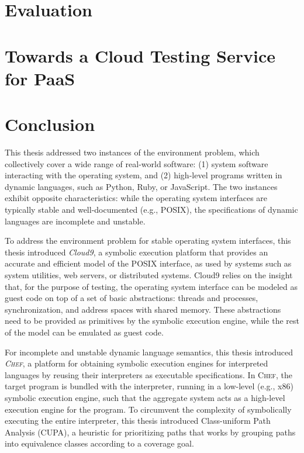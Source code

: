 \documentclass[letterpaper,10pt,oneside]{book}
\newcommand{\cnine}{Cloud9\xspace}
\newcommand{\chef}{\textsc{Chef}\xspace}
\begin{document}
\chapter{Evaluation}
\label{ch:evaluation}


\chapter{Towards a Cloud Testing Service for PaaS}
\label{ch:paas}


\chapter{Conclusion}
\label{ch:conclusion}

This thesis addressed two instances of the environment problem, which collectively cover a wide range of real-world software: (1) system software interacting with the operating system, and (2) high-level programs written in dynamic languages, such as Python, Ruby, or JavaScript.  The two instances exhibit opposite characteristics: while the operating system interfaces are typically stable and well-documented (e.g., POSIX), the specifications of dynamic languages are incomplete and unstable.

To address the environment problem for stable operating system interfaces, this thesis introduced \emph{\cnine}, a symbolic execution platform that provides an accurate and efficient model of the POSIX interface, as used by systems such as system utilities, web servers, or distributed systems.
%
\cnine relies on the insight that, for the purpose of testing, the operating system interface can be modeled as guest code on top of a set of basic abstractions: threads and processes, synchronization, and address spaces with shared memory. These abstractions need to be provided as primitives by the symbolic execution engine, while the rest of the model can be emulated as guest code.

For incomplete and unstable dynamic language semantics, this thesis introduced \emph{\chef}, a platform for obtaining symbolic execution engines for interpreted languages by reusing their interpreters as executable specifications.  In \chef, the target program is bundled with the interpreter, running in a low-level (e.g., x86) symbolic execution engine, such that the aggregate system acts as a high-level execution engine for the program.
%
%
To circumvent the complexity of symbolically executing the entire interpreter, this thesis introduced Class-uniform Path Analysis (CUPA), a heuristic for prioritizing paths that works by grouping paths into equivalence classes according to a coverage goal.



\end{document}
